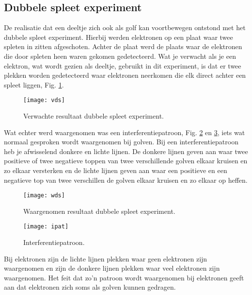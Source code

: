 \documentclass[11pt,fleqn]{book} %
\begin{document}
\subsection{Dubbele spleet experiment}
De realisatie dat een deeltje zich ook als golf kan voortbewegen ontstond met het dubbele spleet experiment. Hierbij werden elektronen op een plaat waar twee spleten in zitten afgeschoten. Achter de plaat werd de plaats waar de elektronen die door spleten heen waren gekomen gedetecteerd. Wat je verwacht als je een elektron, wat wordt gezien als deeltje, gebruikt in dit experiment, is dat er twee plekken worden gedetecteerd waar elektronen neerkomen die elk direct achter een spleet liggen, Fig. \ref{fig:vds}.
\begin{figure}[h]
	\centering\texttt{[image: vds]}
	\caption{Verwachte resultaat dubbele spleet experiment.}
	\label{fig:vds}
\end{figure}
Wat echter werd waargenomen was een interferentiepatroon, Fig. \ref{fig:wds} en \ref{fig:ipat}, iets wat normaal gesproken wordt waargenomen bij golven. Bij een interferentiepatroon heb je afwisselend donkere en lichte lijnen. De donkere lijnen geven aan waar twee positieve of twee negatieve toppen van twee verschillende golven elkaar kruisen en zo elkaar versterken en de lichte lijnen geven aan waar een positieve en een negatieve top van twee verschillen de golven elkaar kruisen en zo elkaar op heffen.
\begin{figure}[h]
	\centering\texttt{[image: wds]}
	\caption{Waargenomen resultaat dubbele spleet experiment.}
	\label{fig:wds}
\end{figure}
\begin{figure}[h]
	\centering\texttt{[image: ipat]}
	\caption{Interferentiepatroon.}
	\label{fig:ipat}
\end{figure}
Bij elektronen zijn de lichte lijnen plekken waar geen elektronen zijn waargenomen en zijn de donkere lijnen plekken waar veel elektronen zijn waargenomen. Het feit dat zo’n patroon wordt waargenomen bij elektronen geeft aan dat elektronen zich soms als golven kunnen gedragen.
\end{document}
